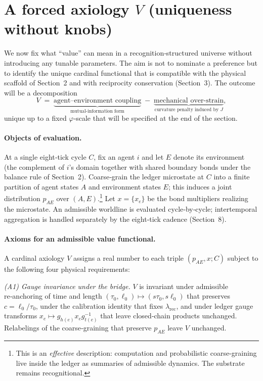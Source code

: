 \documentclass[11pt]{article}
\begin{document}
\section{A forced axiology $V$ (uniqueness without knobs)}

We now fix what ``value'' can mean in a recognition‑structured universe without introducing any tunable parameters. The aim is not to nominate a preference but to identify the unique cardinal functional that is compatible with the physical scaffold of Section~2 and with reciprocity conservation (Section~3). The outcome will be a decomposition
\[
V \;=\; \underbrace{\text{agent--environment coupling}}_{\text{mutual‑information form}}
\;-\;
\underbrace{\text{mechanical over‑strain}}_{\text{curvature penalty induced by $J$}},
\]
unique up to a fixed $\varphi$‑scale that will be specified at the end of the section.

\paragraph{Objects of evaluation.}
At a single eight‑tick cycle $C$, fix an agent $i$ and let $E$ denote its environment (the complement of $i$’s domain together with shared boundary bonds under the balance rule of Section~2). Coarse‑grain the ledger microstate at $C$ into a finite partition of agent states $A$ and environment states $E$; this induces a joint distribution $p_{AE}$ over $(A,E)$.\footnote{This is an \emph{effective} description: computation and probabilistic coarse‑graining live inside the ledger as summaries of admissible dynamics. The substrate remains recognitional.} Let $x=\{x_e\}$ be the bond multipliers realizing the microstate. An admissible worldline is evaluated cycle‑by‑cycle; intertemporal aggregation is handled separately by the eight‑tick cadence (Section~8).

\paragraph{Axioms for an admissible value functional.}
A cardinal axiology $V$ assigns a real number to each triple $(p_{AE},x;C)$ subject to the following four physical requirements:

\emph{(A1) Gauge invariance under the bridge.} $V$ is invariant under admissible re‑anchoring of time and length $(\tau_0,\ell_0)\mapsto(s\tau_0,s\ell_0)$ that preserves $c=\ell_0/\tau_0$, under the calibration identity that fixes $\lambda_{\mathrm{rec}}$, and under ledger gauge transforms $x_e\mapsto g_{h(e)}x_eg^{-1}_{t(e)}$ that leave closed‑chain products unchanged. Relabelings of the coarse‑graining that preserve $p_{AE}$ leave $V$ unchanged.
\end{document}
